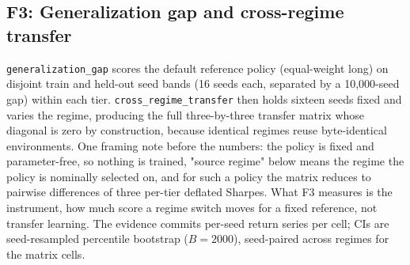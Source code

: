 \subsection{F3: Generalization gap and cross-regime transfer}\label{sec:f3}

\texttt{generalization\_gap} scores the default reference policy (equal-weight long) on disjoint train and held-out seed bands (16 seeds each, separated by a 10{,}000-seed gap) within each tier. \texttt{cross\_regime\_transfer} then holds sixteen seeds fixed and varies the regime, producing the full three-by-three transfer matrix whose diagonal is zero by construction, because identical regimes reuse byte-identical environments. One framing note before the numbers: the policy is fixed and parameter-free, so nothing is trained, "source regime" below means the regime the policy is nominally selected on, and for such a policy the matrix reduces to pairwise differences of three per-tier deflated Sharpes. What F3 measures is the instrument, how much score a regime switch moves for a fixed reference, not transfer learning. The evidence commits per-seed return series per cell; CIs are seed-resampled percentile bootstrap ($B = 2000$), seed-paired across regimes for the matrix cells.

